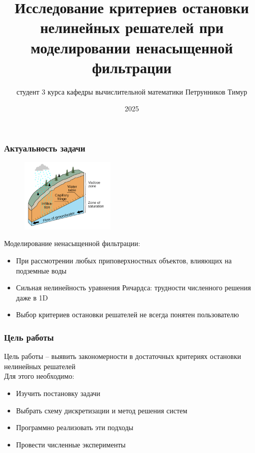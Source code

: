 \documentclass{beamer}
\title{Исследование критериев остановки нелинейных решателей при моделировании ненасыщенной фильтрации}
\author{студент 3 курса кафедры вычислительной математики Петрунников Тимур}
\institute{Научный руководитель: к.ф.-м.н. Ануприенко Денис Валерьевич}
\date{2025}
\begin{document}
	
	\frame{\titlepage}
	
	\begin{frame}
		\frametitle{Актуальность задачи}
		\begin{figure}[h] \centering
			\includegraphics[width=0.4\textwidth]{cap_fringe}
		\end{figure}
		Моделирование ненасыщенной фильтрации:
		\begin{itemize}
			\item При рассмотрении любых приповерхностных объектов, влияющих на подземные воды
			\item Сильная нелинейность уравнения Ричардса: трудности численного решения даже в 1D
			\item Выбор критериев остановки решателей не всегда понятен пользователю
		\end{itemize}
	\end{frame}
	
	
	\begin{frame}
		\frametitle{Цель работы}
		Цель работы -- выявить закономерности в достаточных критериях остановки нелинейных решателей\\
		Для этого необходимо:
		\begin{itemize}
			\item Изучить постановку задачи
			\item Выбрать схему дискретизации и метод решения систем
			\item Программно реализовать эти подходы
			\item Провести численные эксперименты
		\end{itemize}
	\end{frame}
	
	
	
\end{document}
